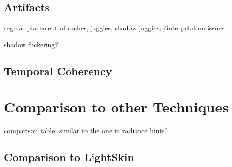 \documentclass[thesis.tex]{subfiles}
\begin{document}
\subsection{Artifacts}
regular placement of caches, jaggies,
shadow jaggies,
/interpolation issues

shadow flickering?

\subsection{Temporal Coherency}

\section{Comparison to other Techniques} \label{sec:eva:comparisiontoother}

comparison table, similar to the one in radiance hints?

\subsection{Comparison to LightSkin}

\subfilebib %
\end{document}
